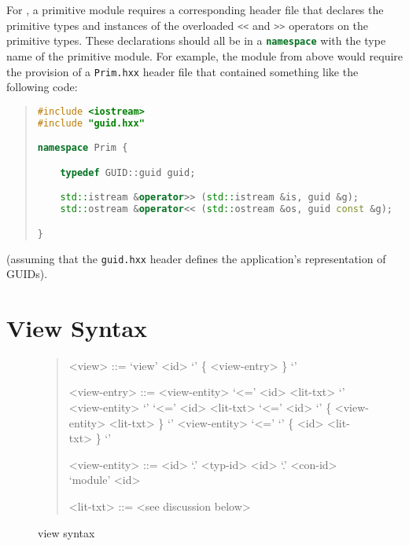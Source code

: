 For \Cplusplus{}, a primitive module requires a corresponding header file that declares
the primitive types and instances of the overloaded \lstinline[language=c++]!<<! and
\lstinline[language=c++]!>>! operators on the primitive types.  These declarations should
all be in a \lstinline[language=c++]!namespace! with the type name of the primitive module.
For example, the module from above would require the provision of a \texttt{Prim.hxx} header
file that contained something like the following code:
%
\begin{quote}\begin{lstlisting}[language=c++]
#include <iostream>
#include "guid.hxx"

namespace Prim {

    typedef GUID::guid guid;

    std::istream &operator>> (std::istream &is, guid &g);
    std::ostream &operator<< (std::ostream &os, guid const &g);

}
\end{lstlisting}\end{quote}%
(assuming that the \texttt{guid.hxx} header defines the application's representation
of GUIDs).


\section{View Syntax}

\begin{figure}[t]
  \begin{quote}
    \begin{grammar}
      <view>        ::= `view' <id> `{' \{ <view-entry> \} `}'

      <view-entry>  ::= <view-entity>  `<=' <id> <lit-txt>
         \alt{} `{' {<view-entity>} `}' `<=' <id> <lit-txt>
         \alt{} `<=' <id> `{' \{ <view-entity> <lit-txt> \} `}'
         \alt{} <view-entity> `<=' `{' \{ <id> <lit-txt> \} `}'

      <view-entity> ::= <id> `.' <typ-id>
         \alt{} <id> `.' <con-id>
         \alt{} `module' <id>

      <lit-txt>     ::= <see discussion below>
    \end{grammar}
  \end{quote}
  \caption{\asdl{} view syntax}
  \label{fig:view-syntax}
\end{figure}%


